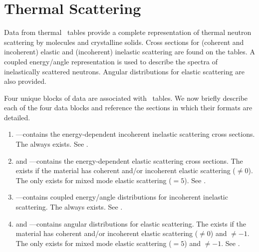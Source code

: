 \section[Thermal Scattering]{Thermal Scattering \SaB}\label{sec:ThermalScattering}

Data from thermal \SaB\ tables provide a complete representation of thermal neutron scattering by molecules
and crystalline solids. Cross sections for (coherent and incoherent) elastic and (incoherent) inelastic
scattering are found on the tables. A coupled energy/angle representation is used to describe the spectra
of inelastically scattered neutrons. Angular distributions for elastic scattering are also provided.

Four unique blocks of data are associated with \SaB\ tables. We now briefly describe each of the four data
blocks and reference the sections in which their formats are detailed.

\begin{enumerate}
  \item \textbf{}---contains the energy-dependent incoherent inelastic scattering cross sections.
                                The   always exists. See .
  \item \textbf{} and \textbf{}---contains the energy-dependent elastic scattering cross sections.
                                The  exists if the material has coherent and/or incoherent elastic scattering
                                ($\neq0$). The  only exists for mixed mode elastic scattering ($=5$).
                                See .
  \item \textbf{}---contains coupled energy/angle distributions for incoherent inelastic scattering.
                                The  always exists. See .
  \item \textbf{} and \textbf{}---contains angular distributions for elastic scattering.
                                The  exists if the material has coherent and/or incoherent elastic scattering
                                ($\neq0$) and $\neq-1$. The  only exists for mixed mode elastic
                                scattering ($=5$) and $\neq-1$. See .
\end{enumerate}

